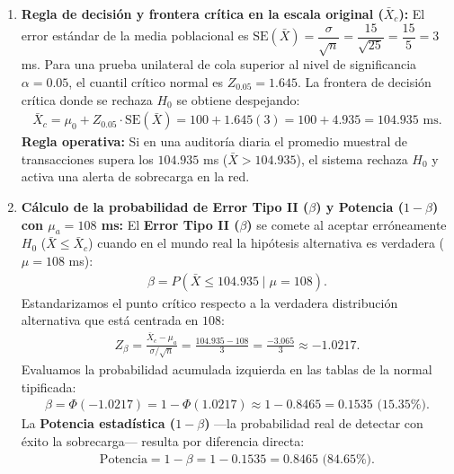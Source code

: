 \begin{solproblema}
	\begin{enumerate}
		\item \textbf{Regla de decisión y frontera crítica en la escala original ($\bar{X}_c$):}
		El error estándar de la media poblacional es $\text{SE}(\bar{X}) = \dfrac{\sigma}{\sqrt{n}} = \dfrac{15}{\sqrt{25}} = \dfrac{15}{5} = 3$ ms.
		Para una prueba unilateral de cola superior al nivel de significancia $\alpha = 0.05$, el cuantil crítico normal es $Z_{0.05} = 1.645$.
		La frontera de decisión crítica donde se rechaza $H_0$ se obtiene despejando:
		\begin{align}
			\bar{X}_c = \mu_0 + Z_{0.05} \cdot \text{SE}(\bar{X}) = 100 + 1.645(3) = 100 + 4.935 = 104.935 \text{ ms.}
		\end{align}
		\textbf{Regla operativa:} Si en una auditoría diaria el promedio muestral de transacciones supera los $104.935$ ms ($\bar{X} > 104.935$), el sistema rechaza $H_0$ y activa una alerta de sobrecarga en la red.
		
		\item \textbf{Cálculo de la probabilidad de Error Tipo II ($\beta$) y Potencia ($1-\beta$) con $\mu_a = 108$ ms:}
		El \textbf{Error Tipo II ($\beta$)} se comete al aceptar erróneamente $H_0$ ($\bar{X} \le \bar{X}_c$) cuando en el mundo real la hipótesis alternativa es verdadera ($\mu = 108$ ms):
		\begin{align}
			\beta = P\left(\bar{X} \le 104.935 \mid \mu = 108\right).
		\end{align}
		Estandarizamos el punto crítico respecto a la verdadera distribución alternativa que está centrada en $108$:
		\begin{align}
			Z_\beta = \frac{\bar{X}_c - \mu_a}{\sigma/\sqrt{n}} = \frac{104.935 - 108}{3} = \frac{-3.065}{3} \approx -1.0217.
		\end{align}
		Evaluamos la probabilidad acumulada izquierda en las tablas de la normal tipificada:
		\begin{align}
			\beta = \Phi(-1.0217) = 1 - \Phi(1.0217) \approx 1 - 0.8465 = 0.1535 \text{ (15.35\%).}
		\end{align}
		La \textbf{Potencia estadística ($1-\beta$)} —la probabilidad real de detectar con éxito la sobrecarga— resulta por diferencia directa:
		\begin{align}
			\text{Potencia} = 1 - \beta = 1 - 0.1535 = 0.8465 \text{ (84.65\%).}
		\end{align}
		

\end{enumerate}
\end{solproblema}
